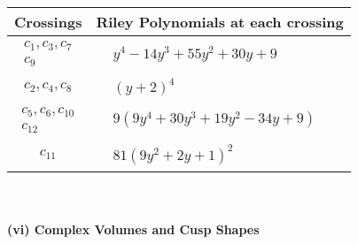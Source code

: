 \documentclass[1p]{elsarticle_modified}
\theoremstyle{definition}
\begin{document}
\begin{tabular}{m{50pt}|m{274pt}}
Crossings & \hspace{64pt}Riley Polynomials at each crossing \\
\hline $$\begin{aligned}c_{1},c_{3},c_{7}\\c_{9}\end{aligned}$$&$\begin{aligned}
&y^4-14 y^3+55 y^2+30 y+9
\end{aligned}$\\
\hline $$\begin{aligned}c_{2},c_{4},c_{8}\end{aligned}$$&$\begin{aligned}
&(y+2)^4
\end{aligned}$\\
\hline $$\begin{aligned}c_{5},c_{6},c_{10}\\c_{12}\end{aligned}$$&$\begin{aligned}
&9(9 y^4+30 y^3+19 y^2-34 y+9)
\end{aligned}$\\
\hline $$\begin{aligned}c_{11}\end{aligned}$$&$\begin{aligned}
&81(9 y^2+2 y+1)^2
\end{aligned}$\\
\hline
\end{tabular}\\~\\
\newpage\flushleft \textbf{(vi) Complex Volumes and Cusp Shapes}
\end{document}

